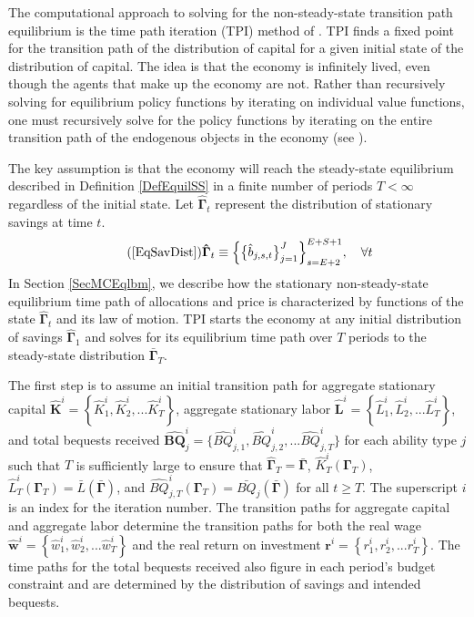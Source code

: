 \documentclass[letterpaper,12pt]{article}
\theoremstyle{definition}
\begin{document}
  The computational approach to solving for the non-steady-state transition path equilibrium is the time path iteration (TPI) method of \citet{AuerbachKotlikoff:1987}. TPI finds a fixed point for the transition path of the distribution of capital for a given initial state of the distribution of capital. The idea is that the economy is infinitely lived, even though the agents that make up the economy are not. Rather than recursively solving for equilibrium policy functions by iterating on individual value functions, one must recursively solve for the policy functions by iterating on the entire transition path of the endogenous objects in the economy (see \citet[ch. 17]{StokeyLucas:1989}).

  The key assumption is that the economy will reach the steady-state equilibrium described in Definition \ref{DefEquilSS} in a finite number of periods $T<\infty$ regardless of the initial state. Let $\bm{\hat{\Gamma}}_t$ represent the distribution of stationary savings at time $t$.
  \begin{equation}\tag{\ref{EqSavDist}}
    \bm{\hat{\Gamma}}_t \equiv \Bigl\{\bigl\{\hat{b}_{j,s,t}\bigr\}_{j=1}^J\Bigr\}_{s=E+2}^{E+S+1}, \quad\forall t
  \end{equation}
  In Section \ref{SecMCEqlbm}, we describe how the stationary non-steady-state equilibrium time path of allocations and price is characterized by functions of the state $\bm{\hat{\Gamma}}_t$ and its law of motion. TPI starts the economy at any initial distribution of savings $\bm{\hat{\Gamma}}_1$ and solves for its equilibrium time path over $T$ periods to the steady-state distribution $\bm{\bar{\Gamma}}_T$.

  The first step is to assume an initial transition path for aggregate stationary capital $\bm{\hat{K}}^i = \left\{\hat{K}_1^i,\hat{K}_2^i,...\hat{K}_T^i\right\}$, aggregate stationary labor $\bm{\hat{L}}^i = \left\{\hat{L}_1^i,\hat{L}_2^i,...\hat{L}_T^i\right\}$, and total bequests received $\bm{\hat{BQ}}_j^i=\{\hat{BQ}_{j,1}^i,\hat{BQ}_{j,2}^i,...\hat{BQ}_{j,T}^i\}$ for each ability type $j$ such that $T$ is sufficiently large to ensure that $\bm{\hat{\Gamma}}_T = \bar{\bm{\Gamma}}$, $\hat{K}_T^i\left(\bm{\Gamma}_T\right)$, $\hat{L}_T^i\left(\bm{\Gamma}_T\right) = \bar{L}\left(\bar{\bm{\Gamma}}\right)$, and $\hat{BQ}_{j,T}^i\left(\bm{\Gamma}_T\right) = \bar{BQ}_j\left(\bar{\bm{\Gamma}}\right)$ for all $t\geq T$. The superscript $i$ is an index for the iteration number. The transition paths for aggregate capital and aggregate labor determine the transition paths for both the real wage $\bm{\hat{w}}^i = \left\{\hat{w}_1^i,\hat{w}_2^i,...\hat{w}_T^i\right\}$ and the real return on investment $\bm{r}^i = \left\{r_1^i,r_2^i,...r_T^i\right\}$. The time paths for the total bequests received also figure in each period's budget constraint and are determined by the distribution of savings and intended bequests.
\end{document}
